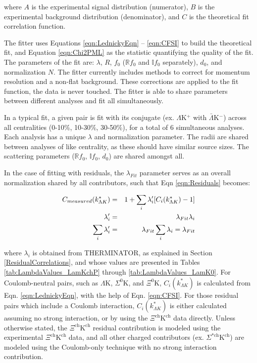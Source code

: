 \documentclass[ALICE,manyauthors]{cernphprep}
\begin{document}
where $A$ is the experimental signal distribution (numerator), $B$ is the experimental background distribution (denominator), and $C$ is the theoretical fit correlation function.

The fitter uses Equations \ref{eqn:LednickyEqn} -- \ref{eqn:CFSI} to build the theoretical fit, and Equation \ref{eqn:Chi2PML} as the statistic quantifying the quality of the fit.
The parameters of the fit are: $\lambda$, $R$, $f_{0}$ ($\mathbb{R}f_{0}$ and $\mathbb{I}f_{0}$ separately), $d_{0}$, and normalization $N$.
The fitter currently includes methods to correct for momentum resolution and a non-flat background.
These corrections are applied to the fit function, the data is never touched.
The fitter is able to share parameters between different analyses and fit all simultaneously.  

In a typical fit, a given pair is fit with its conjugate (ex. $\Lambda$K$^{+}$ with $\bar{\Lambda}$K$^{-}$) across all centralities (0-10\%, 10-30\%, 30-50\%), for a total of 6 simultaneous analyses.
Each analysis has a unique $\lambda$ and normalization parameter.
The radii are shared between analyses of like centrality, as these should have similar source sizes.
The scattering parameters ($\mathbb{R}f_{0}$, $\mathbb{I}f_{0}$, $d_{0}$) are shared amongst all.

In the case of fitting with residuals, the $\lambda_{Fit}$ parameter serves as an overall normalization shared by all contributors, such that Eqn \ref{eqn:Residuals} becomes:

\begin{eqnarray}
 C_{measured}(k^{*}_{\Lambda K}) &=& 1 + \sum\limits_{i}\lambda_{i}'[C_{i}(k^{*}_{\Lambda K})-1] \\
 \lambda_{i}' &=& \lambda_{Fit}\lambda_{i} \notag \\
 \sum\limits_{i}\lambda_{i}' &=&  \lambda_{Fit}\sum\limits_{i}\lambda_{i} = \lambda_{Fit} \notag
\label{eqn:ResidualsvLambdaNorm} 
\end{eqnarray}

where $\lambda_{i}$ is obtained from THERMINATOR, as explained in Section \ref{ResidualCorrelations}, and whose values are presented in Tables \ref{tab:LambdaValues_LamKchP} through \ref{tab:LambdaValues_LamK0}.  For Coulomb-neutral pairs, such as $\Lambda$K, $\Sigma^{0}$K, and $\Xi^{0}$K, $C_{i}(k^{*}_{\Lambda K})$ is calculated from Eqn. \ref{eqn:LednickyEqn}, with the help of Eqn. \ref{eqn:CFSI}.  For those residual pairs which include a Coulomb interaction, $C_{i}(k^{*}_{\Lambda K})$ is either calculated assuming no strong interaction, or by using the $\Xi^{\mathrm{ch}}\mathrm{K^{ch}}$ data directly.  Unless otherwise stated, the $\Xi^{\mathrm{ch}}\mathrm{K^{ch}}$ residual contribution is modeled using the experimental $\Xi^{\mathrm{ch}}\mathrm{K^{ch}}$ data, and all other charged contributors (ex. $\Sigma^{*\mathrm{ch}}\mathrm{K^{ch}}$) are modeled using the Coulomb-only technique with no strong interaction contribution.
\end{document}
